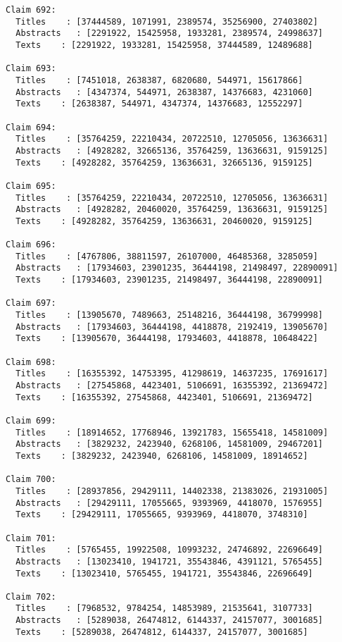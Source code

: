 \documentclass[11pt]{article}
\begin{document}
\begin{Verbatim}[commandchars=\\\{\}]
Claim 692:
  Titles    : [37444589, 1071991, 2389574, 35256900, 27403802]
  Abstracts   : [2291922, 15425958, 1933281, 2389574, 24998637]
  Texts    : [2291922, 1933281, 15425958, 37444589, 12489688]

Claim 693:
  Titles    : [7451018, 2638387, 6820680, 544971, 15617866]
  Abstracts   : [4347374, 544971, 2638387, 14376683, 4231060]
  Texts    : [2638387, 544971, 4347374, 14376683, 12552297]

Claim 694:
  Titles    : [35764259, 22210434, 20722510, 12705056, 13636631]
  Abstracts   : [4928282, 32665136, 35764259, 13636631, 9159125]
  Texts    : [4928282, 35764259, 13636631, 32665136, 9159125]

Claim 695:
  Titles    : [35764259, 22210434, 20722510, 12705056, 13636631]
  Abstracts   : [4928282, 20460020, 35764259, 13636631, 9159125]
  Texts    : [4928282, 35764259, 13636631, 20460020, 9159125]

Claim 696:
  Titles    : [4767806, 38811597, 26107000, 46485368, 3285059]
  Abstracts   : [17934603, 23901235, 36444198, 21498497, 22890091]
  Texts    : [17934603, 23901235, 21498497, 36444198, 22890091]

Claim 697:
  Titles    : [13905670, 7489663, 25148216, 36444198, 36799998]
  Abstracts   : [17934603, 36444198, 4418878, 2192419, 13905670]
  Texts    : [13905670, 36444198, 17934603, 4418878, 10648422]

Claim 698:
  Titles    : [16355392, 14753395, 41298619, 14637235, 17691617]
  Abstracts   : [27545868, 4423401, 5106691, 16355392, 21369472]
  Texts    : [16355392, 27545868, 4423401, 5106691, 21369472]

Claim 699:
  Titles    : [18914652, 17768946, 13921783, 15655418, 14581009]
  Abstracts   : [3829232, 2423940, 6268106, 14581009, 29467201]
  Texts    : [3829232, 2423940, 6268106, 14581009, 18914652]

Claim 700:
  Titles    : [28937856, 29429111, 14402338, 21383026, 21931005]
  Abstracts   : [29429111, 17055665, 9393969, 4418070, 1576955]
  Texts    : [29429111, 17055665, 9393969, 4418070, 3748310]

Claim 701:
  Titles    : [5765455, 19922508, 10993232, 24746892, 22696649]
  Abstracts   : [13023410, 1941721, 35543846, 4391121, 5765455]
  Texts    : [13023410, 5765455, 1941721, 35543846, 22696649]

Claim 702:
  Titles    : [7968532, 9784254, 14853989, 21535641, 3107733]
  Abstracts   : [5289038, 26474812, 6144337, 24157077, 3001685]
  Texts    : [5289038, 26474812, 6144337, 24157077, 3001685]


\end{Verbatim}
\end{document}
